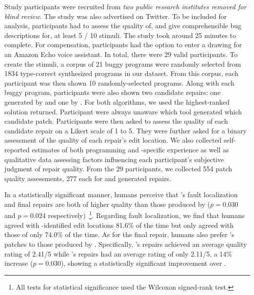 %
Study participants were recruited from \emph{two public research
institutes removed for blind review}. The study was also advertised on Twitter.
To be included for analysis, participants had to assess the quality of, and give
comprehensible bug descriptions for, at least 5 / 10 stimuli. The study took around
25 minutes to complete. For compensation, participants had the option to enter a
drawing for an Amazon Echo voice assistant. In total, there were
29 valid participants.
%
To create the stimuli, a corpus of 21 buggy programs were randomly selected from
1834 type-correct synthesized programs in our dataset. From this corpus, each
participant was then shown 10 randomly-selected programs. Along with each buggy
program, participants were also shown two candidate repairs: one generated by
\toolname and one by \seminal. For both algorithms, we used the highest-ranked
solution returned. Participant were always unaware which tool generated which
candidate patch. Participants were then asked to assess the quality of each
candidate repair on a Likert scale of 1 to 5. They were further asked for a
binary assessment of the quality of each repair's edit location.
We also collected self-reported estimates of both programming and
\ocaml-specific experience as well as qualitative data assessing factors
influencing each participant's subjective judgment of repair quality.
From the 29 participants, we collected 554 patch quality assessments, 277 each
for \toolname and \seminal generated repairs.


%
In a statistically significant manner, humans perceive that
\toolname's fault localization and final repairs are both 
of higher quality than those produced by \seminal ($p=0.030$ 
and $p=0.024$ respectively)~\footnote{All tests for statistical 
significance used the Wilcoxon signed-rank test.}.
%
Regarding fault localization, we find that humans agreed
with \toolname-identified edit locations 81.6\% of the time 
but only agreed with those of \seminal only 74.0\% of the time. 
%
%
As for the final repair, humans also prefer \toolname's patches
to those produced by \seminal. Specifically, \toolname's repairs 
achieved an average quality rating of 2.41/5 while \seminal's 
repairs had an average rating of only 2.11/5, a 14\% increase ($p=0.030$),
showing a statistically significant improvement over \seminal.

